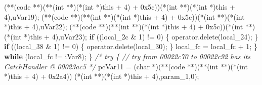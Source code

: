 \documentclass[
]{article}
\newenvironment{Shaded}{}{}
\newcommand{\BaseNTok}[1]{\textcolor[rgb]{0.25,0.63,0.44}{#1}}
\newcommand{\CommentTok}[1]{\textcolor[rgb]{0.38,0.63,0.69}{\textit{#1}}}
\newcommand{\ControlFlowTok}[1]{\textcolor[rgb]{0.00,0.44,0.13}{\textbf{#1}}}
\newcommand{\DataTypeTok}[1]{\textcolor[rgb]{0.56,0.13,0.00}{#1}}
\newcommand{\DecValTok}[1]{\textcolor[rgb]{0.25,0.63,0.44}{#1}}
\newcommand{\NormalTok}[1]{#1}
\newcommand{\OperatorTok}[1]{\textcolor[rgb]{0.40,0.40,0.40}{#1}}
\begin{document}
\begin{Shaded}
\begin{Highlighting}[]
      \OperatorTok{(**(}\NormalTok{code }\OperatorTok{**)(**(}\DataTypeTok{int} \OperatorTok{**)(*(}\DataTypeTok{int} \OperatorTok{*)}\NormalTok{this }\OperatorTok{+} \DecValTok{4}\OperatorTok{)} \OperatorTok{+} \BaseNTok{0x5c}\OperatorTok{))(*(}\DataTypeTok{int} \OperatorTok{**)(*(}\DataTypeTok{int} \OperatorTok{*)}\NormalTok{this }\OperatorTok{+} \DecValTok{4}\OperatorTok{),}\NormalTok{uVar19}\OperatorTok{);}
      \OperatorTok{(**(}\NormalTok{code }\OperatorTok{**)(**(}\DataTypeTok{int} \OperatorTok{**)(*(}\DataTypeTok{int} \OperatorTok{*)}\NormalTok{this }\OperatorTok{+} \DecValTok{4}\OperatorTok{)} \OperatorTok{+} \BaseNTok{0x5c}\OperatorTok{))(*(}\DataTypeTok{int} \OperatorTok{**)(*(}\DataTypeTok{int} \OperatorTok{*)}\NormalTok{this }\OperatorTok{+} \DecValTok{4}\OperatorTok{),}\NormalTok{uVar22}\OperatorTok{);}
      \OperatorTok{(**(}\NormalTok{code }\OperatorTok{**)(**(}\DataTypeTok{int} \OperatorTok{**)(*(}\DataTypeTok{int} \OperatorTok{*)}\NormalTok{this }\OperatorTok{+} \DecValTok{4}\OperatorTok{)} \OperatorTok{+} \BaseNTok{0x5c}\OperatorTok{))(*(}\DataTypeTok{int} \OperatorTok{**)(*(}\DataTypeTok{int} \OperatorTok{*)}\NormalTok{this }\OperatorTok{+} \DecValTok{4}\OperatorTok{),}\NormalTok{uVar23}\OperatorTok{);}
      \ControlFlowTok{if} \OperatorTok{((}\NormalTok{local\_2c }\OperatorTok{\&} \DecValTok{1}\OperatorTok{)} \OperatorTok{!=} \DecValTok{0}\OperatorTok{)} \OperatorTok{\{}
\NormalTok{        operator}\OperatorTok{.}\NormalTok{delete}\OperatorTok{(}\NormalTok{local\_24}\OperatorTok{);}
      \OperatorTok{\}}
      \ControlFlowTok{if} \OperatorTok{((}\NormalTok{local\_38 }\OperatorTok{\&} \DecValTok{1}\OperatorTok{)} \OperatorTok{!=} \DecValTok{0}\OperatorTok{)} \OperatorTok{\{}
\NormalTok{        operator}\OperatorTok{.}\NormalTok{delete}\OperatorTok{(}\NormalTok{local\_30}\OperatorTok{);}
      \OperatorTok{\}}
\NormalTok{      local\_fc }\OperatorTok{=}\NormalTok{ local\_fc }\OperatorTok{+} \DecValTok{1}\OperatorTok{;}
    \OperatorTok{\}} \ControlFlowTok{while} \OperatorTok{(}\NormalTok{local\_fc }\OperatorTok{!=}\NormalTok{ iVar8}\OperatorTok{);}
  \OperatorTok{\}}
                    \CommentTok{/* try \{ // try from 00022c70 to 00022c92 has its CatchHandler @ 00023ac5 */}
\NormalTok{  pcVar11 }\OperatorTok{=} \OperatorTok{(}\DataTypeTok{char} \OperatorTok{*)(**(}\NormalTok{code }\OperatorTok{**)(**(}\DataTypeTok{int} \OperatorTok{**)(*(}\DataTypeTok{int} \OperatorTok{*)}\NormalTok{this }\OperatorTok{+} \DecValTok{4}\OperatorTok{)} \OperatorTok{+} \BaseNTok{0x2a4}\OperatorTok{))}
                              \OperatorTok{(*(}\DataTypeTok{int} \OperatorTok{**)(*(}\DataTypeTok{int} \OperatorTok{*)}\NormalTok{this }\OperatorTok{+} \DecValTok{4}\OperatorTok{),}\NormalTok{param\_1}\OperatorTok{,}\DecValTok{0}\OperatorTok{);}

\end{Highlighting}
\end{Shaded}
\end{document}
